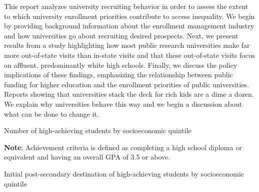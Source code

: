 \documentclass{article}
\begin{document}
This report analyzes university recruiting behavior in order to assess the extent to which university enrollment priorities contribute to access inequality. We begin by providing background information about the enrollment management industry and how universities go about recruiting desired prospects. Next, we present results from a study highlighting how most public research universities make far more out-of-state visits than in-state visits and that these out-of-state visits focus on affluent, predominantly white high schools. Finally, we discuss the policy implications of these findings, emphasizing the relationship between public funding for higher education and the enrollment priorities of public universities. Reports showing that universities stack the deck for rich kids are a dime a dozen. We explain why universities behave this way and we begin a discussion about what can be done to change it.


\renewcommand{\arraystretch}{1.5}%
\begin{table}[!ht]
    \caption{Number of high-achieving students by socioeconomic quintile}\label{tbl:hsls_tbl1}
    \vspace{0.5cm}
    \fontsize{6}{7}\selectfont{}
    
    \begin{flushleft}\textbf{Note}: Achievement criteria is defined as completing a high school diploma or equivalent and having an overall GPA of 3.5 or above.\end{flushleft}
    \vspace{-0.2cm}
\end{table}

\renewcommand{\arraystretch}{1.5}%
\begin{table}[!ht]
    \caption{Initial post-secondary destination of high-achieving students by socioeconomic quintile}\label{tbl:hsls_tbl2}
    \vspace{0.5cm}
    \fontsize{6}{7}\selectfont{}
    
    \vspace{-0.2cm}
\end{table}
\end{document}
